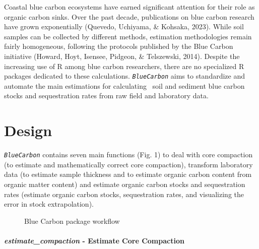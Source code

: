 \documentclass[10pt,a4paper,onecolumn]{article}
\let\oldparagraph\paragraph
\renewcommand{\paragraph}[1]{\oldparagraph{#1}\mbox{}}
\begin{document}
Coastal blue carbon ecosystems have earned significant attention for
their role as organic carbon sinks. Over the past decade, publications
on blue carbon research have grown exponentially (Quevedo, Uchiyama, \&
Kohsaka, 2023). While soil samples can be collected by different
methods, estimation methodologies remain fairly homogeneous, following
the protocols published by the Blue Carbon initiative (Howard, Hoyt,
Isensee, Pidgeon, \& Telszewski, 2014). Despite the increasing use of R
among blue carbon researchers, there are no specialized R packages
dedicated to these calculations. \emph{\texttt{BlueCarbon}} aims to
standardize and automate the main estimations for calculating~ soil and
sediment blue carbon stocks and sequestration rates from raw field and
laboratory data.

\section{Design}\label{design}

\emph{\texttt{BlueCarbon}} contains seven main functions (Fig. 1) to
deal with core compaction (to estimate and mathematically correct core
compaction), transform laboratory data (to estimate sample thickness and
to estimate organic carbon content from organic matter content) and
estimate organic carbon stocks and sequestration rates (estimate organic
carbon stocks, sequestration rates, and visualizing the error in stock
extrapolation).

\begin{figure}
\centering
{}
\caption{Blue Carbon package workflow}
\end{figure}

\paragraph{\texorpdfstring{\textbf{\emph{estimate\_compaction}}
\textbf{- Estimate Core
Compaction}}{estimate\_compaction - Estimate Core Compaction}}\label{estimate_compaction---estimate-core-compaction}
\end{document}
